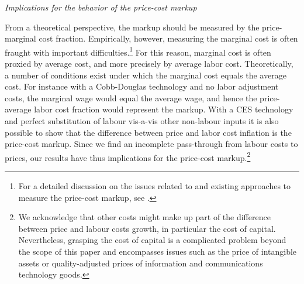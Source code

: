 \documentclass[11pt]{article}
\begin{document}
\bigskip

\textit{Implications for the behavior of the price-cost markup}

From a theoretical perspective, the markup should be measured by the price-marginal cost fraction. Empirically, however, measuring the marginal cost is often fraught with important difficulties.\footnote{For a detailed discussion on the issues related to and existing approaches to measure the price-cost markup, see \cite{NekardaRamey13}.} For this reason, marginal cost is often proxied by average cost, and more precisely by average labor cost. Theoretically, a number of conditions exist under which the marginal cost equals the average cost. For instance with a Cobb-Douglas technology and no labor adjustment costs, the marginal wage would equal the average wage, and hence the price-average labor cost fraction would represent the markup. With a CES technology and perfect substitution of labour vis-a-vis other non-labour inputs it is also possible to show that the difference between price and labor cost inflation is the price-cost markup.
Since we find an incomplete pass-through from labour costs to prices, our results have thus implications for the price-cost markup.\footnote{We acknowledge that other costs might make up part of the difference between price and labour costs growth, in particular the cost of capital. Nevertheless, grasping the cost of capital is a complicated problem beyond the scope of this paper and encompasses issues such as the price of intangible assets or quality-adjusted prices of information and communications technology goods.}  

\end{document}

